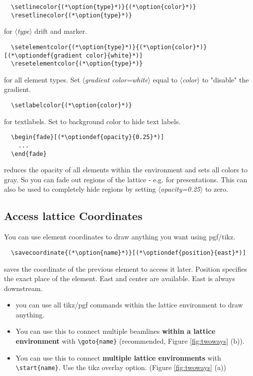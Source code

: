 \documentclass[a4paper]{scrartcl}
\newcommand{\option}[1]{{\color{blue}$\langle$\textit{#1}$\rangle$}}
\newcommand{\optiondef}[2]{{\color{green!50!black}$\langle$\textit{#1=#2}$\rangle$}}
\begin{document}
\begin{lstlisting}
  \setlinecolor{(*\option{type}*)}{(*\option{color}*)}
  \resetlinecolor{(*\option{type}*)}
\end{lstlisting}
for \option{type} drift and marker.

\begin{lstlisting}
  \setelementcolor{(*\option{type}*)}{(*\option{color}*)}[(*\optiondef{gradient color}{white}*)]
  \resetelementcolor{(*\option{type}*)}
\end{lstlisting}
for all element types. Set \optiondef{gradient color}{white} equal to \option{color} to
"disable" the gradient.

\begin{lstlisting}
  \setlabelcolor{(*\option{color}*)}
\end{lstlisting}
for textlabels. Set to background color to hide text labels.


\begin{lstlisting}
  \begin{fade}[(*\optiondef{opacity}{0.25}*)]
    ...
  \end{fade}
\end{lstlisting}
 reduces the opacity of all elements within the environment and sets all colors to gray.
 So you can fade out regions of the lattice - e.g. for presentations.
 This can also be used to completely hide regions by setting \optiondef{opacity}{0.25} to zero.




\subsection{Access lattice Coordinates}
\label{sec:coords}
You can use element coordinates to draw anything you want using pgf/tikz. 

\begin{lstlisting}
  \savecoordinate{(*\option{name}*)}[(*\optiondef{position}{east}*)]
\end{lstlisting}
 saves the coordinate of the previous element to access it later. Position specifies the exact place of the element. East and center are available. East is always downstream.

\begin{itemize}
\item you can use all tikz/pgf commands within the lattice environment to draw anything.
\item You can use this to connect multiple beamlines \textbf{within a lattice environment} with
  \lstinline+\goto{name}+ (recommended, Figure \ref{fig:twoways} (b)).
\item You can use this to connect \textbf{multiple lattice environments} with
  \lstinline+\start{name}+. Use the tikz overlay option. (Figure \ref{fig:twoways} (a))
\end{itemize}
\end{document}
